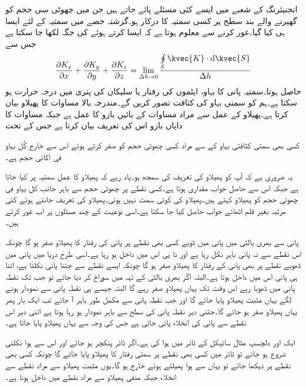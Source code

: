 انجنیئرنگ  کے شعبے میں ایسے کئی مسئلے پائے جاتے ہیں جن  میں چھوٹی سی حجم  کو گھیرنے والے بند سطح پر کسی سمتیہ  کا   درکار ہو۔گزشتہ حصے میں سمتیہ  کے لئے ایسا ہی کیا گیا۔غور کرنے سے معلوم ہوتا ہے کہ ایسا کرتے ہوئے   کی جگہ  لکھا جا سکتا ہے جس سے 
\begin{align}\label{مساوات_گاؤس_کارتیسی_پھیلاو_کی_تعریف}
\frac{\partial K_x}{\partial x}+\frac{\partial K_y}{\partial y}+\frac{\partial K_z}{\partial z}=\lim_{\Delta h \to 0}\frac{\oint\limits_{S}\kvec{K}\cdot \dif \kvec{S}}{\Delta h}
\end{align}
حاصل ہوتا۔سمتیہ  پانی کا بہاو، ایٹموں کی رفتار یا سلیکان کی پتری میں درجہ حرارت ہو سکتا ہے۔ہم  کو سمتی بہاو کی کثافت تصور کریں گے۔مندرجہ بالا مساوات   کا پھیلاو بیان کرتا ہے۔پھیلاو کے عمل سے مراد مساوات کے بائیں بازو کا عمل ہے  جبکہ مساوات کا دایاں بازو اس کی تعریف بیان کرتا ہے جس کے تحت

کسی بھی سمتی کثافتی بہاو کے  سے مراد کسی  چھوٹی حجم کو صفر کرتے ہوئے اس  سے خارج کُل بہاو فی اکائی حجم ہے۔ 

یہ ضروری ہے کہ آپ کو پھیلاو کی تعریف کی سمجھ ہو۔یاد رہے کہ پھیلاو کا عمل سمتیہ پر کیا جاتا ہے جبکہ اس سے حاصل جواب مقداری ہوتا ہے۔کسی نقطے پر چھوٹی حجم سے باہر جانب کل بہاو فی چھوٹی حجم کو پھیلاو کہتے ہیں۔پھیلاو کی کوئی سمت نہیں ہوتی۔پھیلاو کی تعریف جانتے ہوئے کئی مرتبہ بغیر قلم اٹھائے جواب حاصل کیا جا سکتا ہے۔اسی نوعیت کے چند مسئلوں پر اب غور کرتے ہیں۔

پانی سے بھری بالٹی میں پانی میں ڈوبے کسی بھی نقطے پر پانی کی رفتار کا پھیلاو صفر ہو گا چونکہ اس نقطے سے نہ پانی باہر نکل رہا ہے اور نا ہی اس میں داخل ہو رہا ہے۔اسی طرح دریا میں پانی میں ڈھوبے نقطے پر بھی پانی کے رفتار کا پھیلاو صفر ہو گا چونکہ ایسے نقطے سے جتنا پانی نکلتا ہے، اتنا ہی پانی اس میں داخل ہوتا ہے۔البتہ اگر بھری بالٹی کے تہہ میں سوراخ کر دیا جائے  تو جب تک نقطہ پانی میں ڈھوبا رہے اس وقت تک یہاں پھیلاو صفر رہے  گا البتہ جیسے ہی نقطہ پانی سے نمودار ہونے لگے یہاں مثبت پھیلاو پایا جائے گا اور جب نقطہ پانی سے مکمل طور باہر آ جائے تب ایک بار پھر یہاں پھیلاو صفر ہو جائے گا۔جتنی دیر نقطہ پانی کی سطح سے باہر نمودار ہو رہا ہوتا ہے اتنی دیر اس نقطے سے پانی کی انخلاء پائی جاتی ہے جس کی وجہ سے یہاں پھیلاو پایا جاتا ہے۔

ایک اور دلچسپ مثال سائیکل کے ٹائر میں ہوا کی ہے۔اگر ٹائر پنکچر ہو جائے اور اس سے ہوا نکلنی شروع ہو جائے تو ٹائر میں کسی بھی نقطے پر سمتی رفتار کا پھیلاو پایا جائے گا چونکہ کسی بھی نقطے پر دیکھا جائے تو یہاں سے ہوا پھیلتے ہوئے خارج ہو گا۔یوں مثبت پھیلاو سے مراد نقطے سے انخلاء جبکہ منفی پھیلاو سے مراد نقطے میں داخل ہونا ہے۔ 


